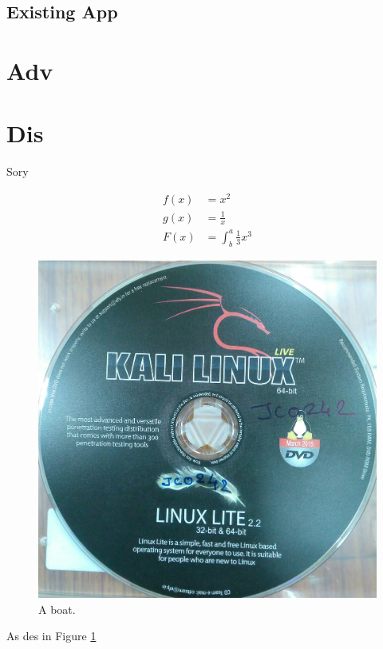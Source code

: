 \documentclass{report}
\begin{document}
\subsection{Existing App}




\section{Adv}

\section{Dis}

Sory 


\begin{align*}
  f(x) &= x^2\\
  g(x) &= \frac{1}{x}\\
  F(x) &= \int^a_b \frac{1}{3}x^3
\end{align*}


\begin{figure}
  \includegraphics[width=\linewidth]{KaliLinux.jpg}
  \caption{A boat.}
  \label{fig:boat1}
\end{figure}


As des in Figure \ref{fig:boat1}


\begin{table}
 
\end{table}
\end{document}
